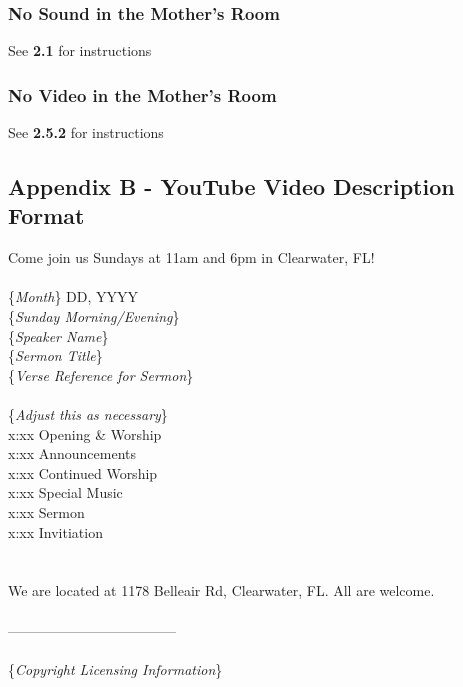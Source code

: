 \documentclass[12pt]{article}
\begin{document}
        \subsubsection{No Sound in the Mother's Room}
        See \textbf{2.1} for instructions

        \subsubsection{No Video in the Mother's Room}
        See \textbf{2.5.2} for instructions

    \newpage
    \subsection{Appendix B - YouTube Video Description Format}
    Come join us Sundays at 11am and 6pm in Clearwater, FL! \\
    \\
    \{\emph{Month}\} DD, YYYY \\
    \{\emph{Sunday Morning/Evening}\} \\
    \{\emph{Speaker Name}\} \\
    \{\emph{Sermon Title}\} \\
    \{\emph{Verse Reference for Sermon}\} \\
    \\
    \{\emph{Adjust this as necessary}\} \\
    x:xx Opening \& Worship \\
    x:xx Announcements \\
    x:xx Continued Worship \\
    x:xx Special Music \\
    x:xx Sermon \\
    x:xx Invitiation \\
    \\
    \\
    We are located at 1178 Belleair Rd, Clearwater, FL. All are welcome. \\
    \\
    ------------------------------------ \\
    \\
    \{\emph{Copyright Licensing Information}\} \\
\end{document}
